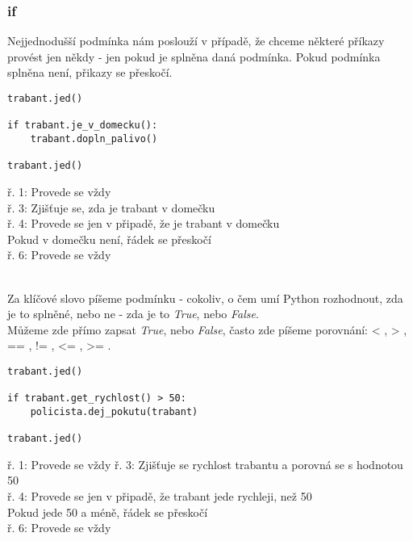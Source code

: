 \subsubsection{if}
Nejjednodušší podmínka  nám poslouží v případě, že chceme některé příkazy provést jen někdy - jen pokud je splněna daná podmínka. Pokud podmínka splněna není, přikazy se přeskočí.\\
\begin{minipage}[t]{.45\textwidth}
\begin{code}
\begin{verbatim}
trabant.jed()

if trabant.je_v_domecku():
	trabant.dopln_palivo()
	
trabant.jed()
\end{verbatim}

\label{code:if}
\end{code}
\end{minipage}
\begin{minipage}[t]{.45\textwidth}
ř. 1:	Provede se vždy\\
ř. 3:	Zjišťuje se, zda je trabant v domečku\\
ř. 4:	Provede se jen v připadě, že je trabant v domečku\\
Pokud v domečku není, řádek se přeskočí\\
ř. 6:	Provede se vždy
\end{minipage}\\

Za klíčové slovo  píšeme podmínku - cokoliv, o čem umí Python rozhodnout, zda je to splněné, nebo ne - zda je to \textit{True}, nebo \textit{False}.\\
Můžeme zde přímo zapsat \textit{True}, nebo \textit{False}, často zde píšeme porovnání: < , > , == , != , <= , >= .\\
\begin{minipage}[t]{.45\textwidth}
\begin{code}
\begin{verbatim}
trabant.jed()

if trabant.get_rychlost() > 50:
	policista.dej_pokutu(trabant)
	
trabant.jed()
\end{verbatim}

\label{code:if_porovnani}
\end{code}
\end{minipage}
\begin{minipage}[t]{.45\textwidth}
ř. 1:	Provede se vždy
ř. 3:	Zjišťuje se rychlost trabantu a porovná se s hodnotou 50\\
ř. 4:	Provede se jen v připadě, že trabant jede rychleji, než 50\\
Pokud jede 50 a méně, řádek se přeskočí\\
ř. 6:	Provede se vždy
\end{minipage}\\

